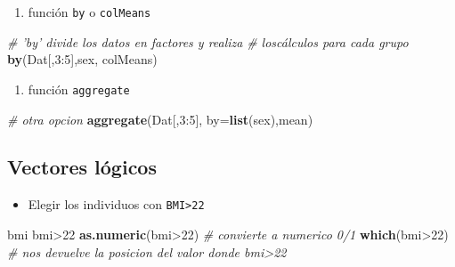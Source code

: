 \documentclass[]{article}
\def\tightlist{}
\newenvironment{Shaded}{\begin{snugshade}}{\end{snugshade}}
\newcommand{\KeywordTok}[1]{\textcolor[rgb]{0.13,0.29,0.53}{\textbf{{#1}}}}
\newcommand{\DataTypeTok}[1]{\textcolor[rgb]{0.13,0.29,0.53}{{#1}}}
\newcommand{\DecValTok}[1]{\textcolor[rgb]{0.00,0.00,0.81}{{#1}}}
\newcommand{\CommentTok}[1]{\textcolor[rgb]{0.56,0.35,0.01}{\textit{{#1}}}}
\newcommand{\NormalTok}[1]{{#1}}
\numberwithin{equation}{section}
\begin{document}
\begin{enumerate}
\def\labelenumi{\arabic{enumi}.}
\setcounter{enumi}{2}
\tightlist
\item
  función \texttt{by} o \texttt{colMeans}
\end{enumerate}

\begin{Shaded}
\begin{Highlighting}[]
\CommentTok{# 'by' divide los datos en factores y realiza }
\CommentTok{#   loscálculos para cada grupo}
\KeywordTok{by}\NormalTok{(Dat[,}\DecValTok{3}\NormalTok{:}\DecValTok{5}\NormalTok{],sex, colMeans) }
\end{Highlighting}
\end{Shaded}

\begin{enumerate}
\def\labelenumi{\arabic{enumi}.}
\setcounter{enumi}{3}
\tightlist
\item
  función \texttt{aggregate}
\end{enumerate}

\begin{Shaded}
\begin{Highlighting}[]
\CommentTok{# otra opcion}
\KeywordTok{aggregate}\NormalTok{(Dat[,}\DecValTok{3}\NormalTok{:}\DecValTok{5}\NormalTok{], }\DataTypeTok{by=}\KeywordTok{list}\NormalTok{(sex),mean) }
\end{Highlighting}
\end{Shaded}

\subsection{Vectores lógicos}\label{vectores-logicos}

\begin{itemize}
\tightlist
\item
  Elegir los individuos con \texttt{BMI\textgreater{}22}
\end{itemize}

\begin{Shaded}
\begin{Highlighting}[]
\NormalTok{bmi}
\NormalTok{bmi>}\DecValTok{22}
\KeywordTok{as.numeric}\NormalTok{(bmi>}\DecValTok{22}\NormalTok{) }\CommentTok{# convierte a numerico 0/1}
\KeywordTok{which}\NormalTok{(bmi>}\DecValTok{22}\NormalTok{)  }\CommentTok{# nos devuelve la posicion del valor donde bmi>22}
\end{Highlighting}
\end{Shaded}
\end{document}
